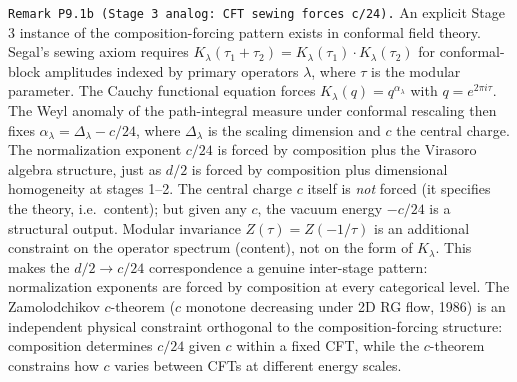 \documentclass[
]{article}
\begin{document}
\texttt{Remark\ P9.1b\ (Stage\ 3\ analog:\ CFT\ sewing\ forces\ c/24).}
An explicit Stage 3 instance of the composition-forcing pattern exists
in conformal field theory. Segal's sewing axiom requires
\(K_\lambda(\tau_1 + \tau_2) = K_\lambda(\tau_1) \cdot K_\lambda(\tau_2)\)
for conformal-block amplitudes indexed by primary operators \(\lambda\),
where \(\tau\) is the modular parameter. The Cauchy functional equation
forces \(K_\lambda(q) = q^{\alpha_\lambda}\) with
\(q = e^{2\pi i \tau}\). The Weyl anomaly of the path-integral measure
under conformal rescaling then fixes
\(\alpha_\lambda = \Delta_\lambda - c/24\), where \(\Delta_\lambda\) is
the scaling dimension and \(c\) the central charge. The normalization
exponent \(c/24\) is forced by composition plus the Virasoro algebra
structure, just as \(d/2\) is forced by composition plus dimensional
homogeneity at stages 1--2. The central charge \(c\) itself is
\emph{not} forced (it specifies the theory, i.e.~content); but given any
\(c\), the vacuum energy \(-c/24\) is a structural output. Modular
invariance \(Z(\tau) = Z(-1/\tau)\) is an additional constraint on the
operator spectrum (content), not on the form of \(K_\lambda\). This
makes the \(d/2 \to c/24\) correspondence a genuine inter-stage pattern:
normalization exponents are forced by composition at every categorical
level. The Zamolodchikov \(c\)-theorem (\(c\) monotone decreasing under
2D RG flow, 1986) is an independent physical constraint orthogonal to
the composition-forcing structure: composition determines \(c/24\) given
\(c\) within a fixed CFT, while the \(c\)-theorem constrains how \(c\)
varies between CFTs at different energy scales.
\end{document}
